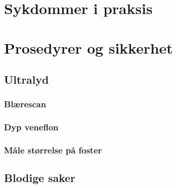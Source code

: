 \documentclass[a4paper,12pt,twoside]{memoir}
\begin{document}
\sffamily

			\renewcommand{\partname}{Del}
			\renewcommand{\chaptername}{Kapittel}
            \renewcommand{\contentsname}{Innhold}
            \renewcommand\listfigurename{Illustrasjoner}
            \renewcommand\tablename{Tabell}
			\renewcommand\listtablename{Tabeller}
            \renewcommand{\figurename}{Illustrasjon}
			\renewcommand{\bibname}{Kilder:}

\frontmatter
	
	
\mainmatter
	\part{Sykdommer i praksis}	
		  {}
		  

	\part{Prosedyrer og sikkerhet}
		\chapter{Ultralyd}
			\section{Blærescan}
			\section{Dyp veneflon}
			\section{Måle størrelse på foster}
		\chapter{Blodige saker}
\end{document}
